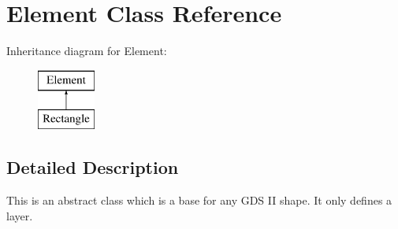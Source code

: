 \hypertarget{class_a_g_d_s_1_1_element}{}\section{Element Class Reference}
\label{class_a_g_d_s_1_1_element}
Inheritance diagram for Element\+:\begin{figure}[H]
\begin{center}
\leavevmode
\includegraphics[height=2.000000cm]{class_a_g_d_s_1_1_element}
\end{center}
\end{figure}


\subsection{Detailed Description}
This is an abstract class which is a base for any G\+DS II shape. It only defines a layer. 